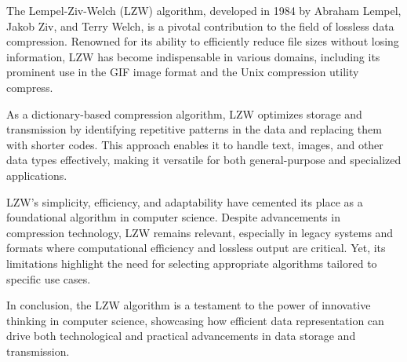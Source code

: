 The Lempel-Ziv-Welch (LZW) algorithm, developed in 1984 by Abraham Lempel, Jakob Ziv, and Terry Welch, is a pivotal contribution to the field of lossless data compression. Renowned for its ability to efficiently reduce file sizes without losing information, LZW has become indispensable in various domains, including its prominent use in the GIF image format and the Unix compression utility compress.

\vspace{10pt}

As a dictionary-based compression algorithm, LZW optimizes storage and transmission by identifying repetitive patterns in the data and replacing them with shorter codes. This approach enables it to handle text, images, and other data types effectively, making it versatile for both general-purpose and specialized applications.

\vspace{10pt}

LZW's simplicity, efficiency, and adaptability have cemented its place as a foundational algorithm in computer science. Despite advancements in compression technology, LZW remains relevant, especially in legacy systems and formats where computational efficiency and lossless output are critical. Yet, its limitations highlight the need for selecting appropriate algorithms tailored to specific use cases.

\vspace{10pt}

In conclusion, the LZW algorithm is a testament to the power of innovative thinking in computer science, showcasing how efficient data representation can drive both technological and practical advancements in data storage and transmission.
